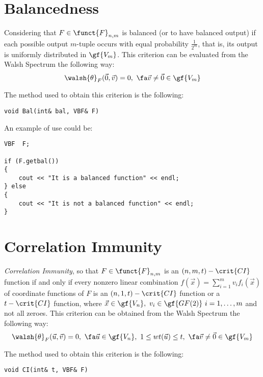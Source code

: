 \section{Balancedness}
Considering that $F \in \funct{F}_{n,m}$ is
  balanced (or to have balanced output) if each possible output $m$-tuple
  occurs with equal probability $\frac{1}{2^m}$, that is, its output is
  uniformly distributed in $\gf{V_m}$. This criterion can be evaluated from the
  Walsh Spectrum the following way: 
\begin{equation}
\walsh{\theta}_F(\vec{0},\vec{v})= 0, \ \fa \vec{v} \neq \vec{0} \in \gf{V_m}
\end{equation}

The method used to obtain this criterion is the following:

\begin{verbatim}
void Bal(int& bal, VBF& F)
\end{verbatim}

An example of use could be:

\begin{verbatim}
VBF  F;

if (F.getbal())
{
    cout << "It is a balanced function" << endl;
} else
{
    cout << "It is not a balanced function" << endl;
}    
\end{verbatim}

\section{Correlation Immunity}

\textsl{Correlation Immunity}, so that $F \in \funct{F}_{n,m}$ is an
  $(n,m,t)-\crit{CI}$ function if and only if every nonzero linear combination
  $f(\vec{x})=\sum_{i=1}^{m} v_if_i(\vec{x})$ of coordinate functions of $F$
  is an $(n,1,t)-\crit{CI}$ function or a $t-\crit{CI}$ function, where $\vec{x} \in \gf{V_n},\  v_i \in
  \gf{GF(2)} \ i=1,\dots,m$ and not all zeroes. This criterion can be obtained
  from the Walsh Spectrum the following way: 
\begin{equation}
\walsh{\theta}_F(\vec{u},\vec{v})= 0, \ \fa \vec{u} \in \gf{V_n}, \ 1 \leq wt(\vec{u}) \leq t, \ \fa \vec{v} \neq \vec{0} \in \gf{V_m}
\end{equation}

The method used to obtain this criterion is the following:

\begin{verbatim}
void CI(int& t, VBF& F)
\end{verbatim}

